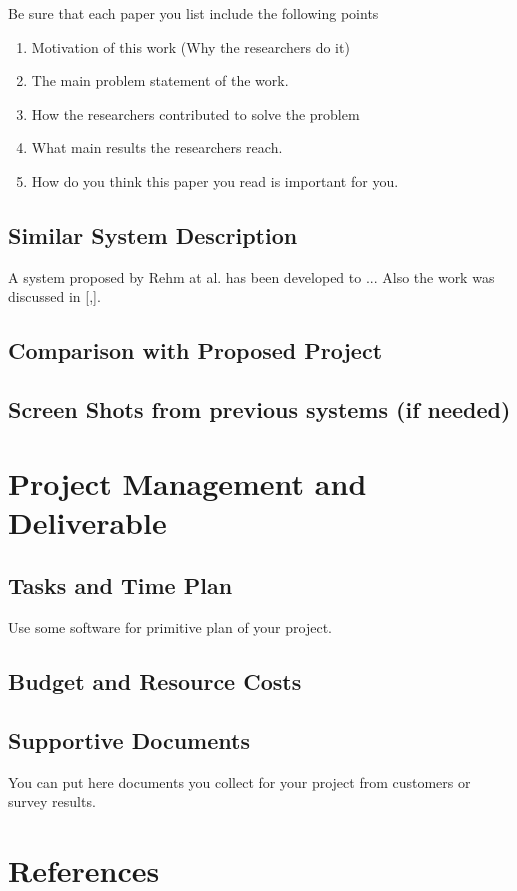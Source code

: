 \documentclass[12pt]{article}
\begin{document}
Be sure that each paper you list include the following points

\begin{enumerate}
\item Motivation of this work (Why the researchers do it)
\item The main problem statement of the work.
\item How the researchers contributed to solve the problem
\item What main results the researchers reach.
\item How do you think this paper you read is important for you. 
\end{enumerate}

\subsection{Similar System Description}
A system proposed by Rehm at al. \cite{Rehm} has been developed to ... Also the work was discussed in [\cite{Weiser},\cite{abc123}].
\subsection{Comparison with Proposed Project}
\subsection{Screen Shots from previous systems (if needed)}

\section{Project Management and Deliverable}
\subsection{Tasks and Time Plan}
Use some software for primitive plan of your project.
\subsection{Budget and Resource Costs}

\subsection{Supportive Documents}
You can put here documents you collect for your project from customers or survey results.
\section {References}



\end{document}
